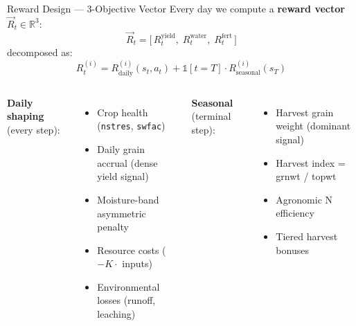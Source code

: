 \documentclass[10pt,aspectratio=169]{beamer}
\newcommand{\R}{\mathbb{R}}
\newcommand{\Rvec}{\vec{R}}
\newcommand{\strong}[1]{\textbf{\textcolor{cAccent}{#1}}}
\begin{document}
\begin{frame}{Reward Design --- 3-Objective Vector}
  Every day we compute a \strong{reward vector} $\Rvec_t \in \R^3$:
  \[
    \Rvec_t = \big[\, R^{\text{yield}}_t,\; R^{\text{water}}_t,\; R^{\text{fert}}_t \,\big]
  \]
  decomposed as:
  \[
    R^{(i)}_t = R^{(i)}_{\text{daily}}(s_t, a_t) + \mathbb{1}[t = T] \cdot R^{(i)}_{\text{seasonal}}(s_T)
  \]

  \vspace{0.5em}
  \begin{columns}[T]
    \textbf{Daily shaping} (every step):
    \begin{itemize}\small
      \item Crop health (\texttt{nstres}, \texttt{swfac})
      \item Daily grain accrual (dense yield signal)
      \item Moisture-band asymmetric penalty
      \item Resource costs ($-K \cdot$ inputs)
      \item Environmental losses (runoff, leaching)
    \end{itemize}

    \textbf{Seasonal} (terminal step):
    \begin{itemize}\small
      \item Harvest grain weight (dominant signal)
      \item Harvest index = grnwt / topwt
      \item Agronomic N efficiency
      \item Tiered harvest bonuses
    \end{itemize}
  \end{columns}
\end{frame}
\end{document}
